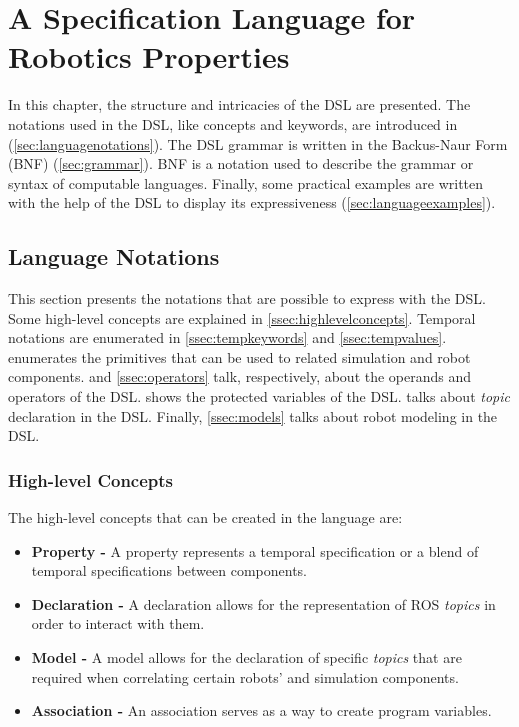 \chapter{A Specification Language for Robotics Properties}
\label{chap:language}

In this chapter, the structure and intricacies of the DSL are presented. The notations used in the DSL, like concepts and keywords, are introduced in (\autoref{sec:languagenotations}). The DSL grammar is written in the Backus-Naur Form (BNF) (\autoref{sec:grammar}). BNF is a notation used to describe the grammar or syntax of computable languages. Finally, some practical examples are written with the help of the DSL to display its expressiveness (\autoref{sec:languageexamples}).


\section{Language Notations}
\label{sec:languagenotations}

This section presents the notations that are possible to express with the DSL. Some high-level concepts are explained in \autoref{ssec:highlevelconcepts}. Temporal notations are enumerated in \autoref{ssec:tempkeywords} and \autoref{ssec:tempvalues}.  enumerates the primitives that can be used to related simulation and robot components.  and \autoref{ssec:operators} talk, respectively, about the operands and operators of the DSL.  shows the protected variables of the DSL.  talks about \textit{topic} declaration in the DSL. Finally, \autoref{ssec:models} talks about robot modeling in the DSL.

\subsection{High-level Concepts}
\label{ssec:highlevelconcepts}

The high-level concepts that can be created in the language are:

\begin{itemize}
\item \textbf{Property -} A property represents a temporal specification or a blend of temporal specifications between components.
\item \textbf{Declaration -} A declaration allows for the representation of ROS \textit{topics} in order to interact with them.
\item \textbf{Model -} A model allows for the declaration of specific \textit{topics} that are required when correlating certain robots' and simulation components.
\item \textbf{Association -} An association serves as a way to create program variables.
\end{itemize}


